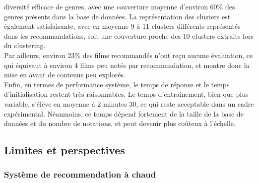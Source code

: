 \documentclass{article}
\begin{document}
    diversité efficace de genres, avec une couverture moyenne d’environ 60\% des genres présents dans la base de données. 
    La représentation des clusters est également satisfaisante, avec en moyenne 9 à 11 clusters différents représentés dans 
    les recommandations, soit une couverture proche des 10 clusters extraits lors du clustering.\\
    Par ailleurs, environ 23\% des films recommandés n’ont reçu aucune évaluation, ce qui équivaut à environ 4 films peu notés 
    par recommandation, et montre donc la mise en avant de contenus peu explorés.\\
    Enfin, en termes de performance système, le temps de réponse et le temps d’initialisation restent très raisonnables. Le temps d’entraînement, bien que plus variable, s’élève en moyenne à 2 minutes 30, ce qui reste acceptable dans un cadre expérimental. Néanmoins, ce temps dépend fortement de la taille de la base de données et du nombre de notations, et peut devenir plus coûteux à l’échelle.

    \subsection{Limites et perspectives}
    \subsubsection{Système de recommendation à chaud}
    $ $\\
    \\
    \\
    \\
    \\
    \\
    \\
\end{document}
